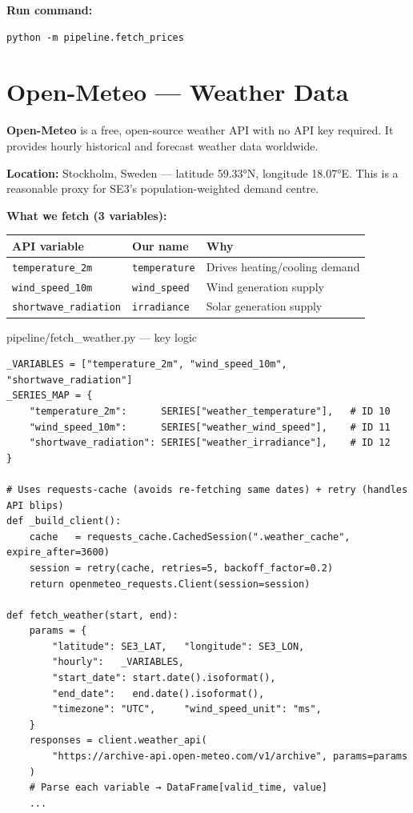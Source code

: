 \documentclass[12pt, a4paper, oneside]{memoir}
\newcommand{\code}[1]{\texttt{\footnotesize #1}}
\begin{document}
\textbf{Run command:}
\begin{verbatim}
python -m pipeline.fetch_prices
\end{verbatim}

\section{Open-Meteo --- Weather Data}

\textbf{Open-Meteo} is a free, open-source weather API with no API key required.
It provides hourly historical and forecast weather data worldwide.

\textbf{Location:} Stockholm, Sweden --- latitude 59.33°N, longitude 18.07°E.
This is a reasonable proxy for SE3's population-weighted demand centre.

\textbf{What we fetch (3 variables):}

\begin{center}
\begin{tabular}{lll}
\toprule
\textbf{API variable} & \textbf{Our name} & \textbf{Why} \\
\midrule
\code{temperature\_2m}      & \code{temperature}   & Drives heating/cooling demand \\
\code{wind\_speed\_10m}     & \code{wind\_speed}   & Wind generation supply \\
\code{shortwave\_radiation} & \code{irradiance}    & Solar generation supply \\
\bottomrule
\end{tabular}
\end{center}

\begin{codefile}{pipeline/fetch\_weather.py --- key logic}
\begin{verbatim}
_VARIABLES = ["temperature_2m", "wind_speed_10m", "shortwave_radiation"]
_SERIES_MAP = {
    "temperature_2m":      SERIES["weather_temperature"],   # ID 10
    "wind_speed_10m":      SERIES["weather_wind_speed"],    # ID 11
    "shortwave_radiation": SERIES["weather_irradiance"],    # ID 12
}

# Uses requests-cache (avoids re-fetching same dates) + retry (handles API blips)
def _build_client():
    cache   = requests_cache.CachedSession(".weather_cache", expire_after=3600)
    session = retry(cache, retries=5, backoff_factor=0.2)
    return openmeteo_requests.Client(session=session)

def fetch_weather(start, end):
    params = {
        "latitude": SE3_LAT,   "longitude": SE3_LON,
        "hourly":   _VARIABLES,
        "start_date": start.date().isoformat(),
        "end_date":   end.date().isoformat(),
        "timezone": "UTC",     "wind_speed_unit": "ms",
    }
    responses = client.weather_api(
        "https://archive-api.open-meteo.com/v1/archive", params=params
    )
    # Parse each variable → DataFrame[valid_time, value]
    ...
\end{verbatim}
\end{codefile}
\end{document}
